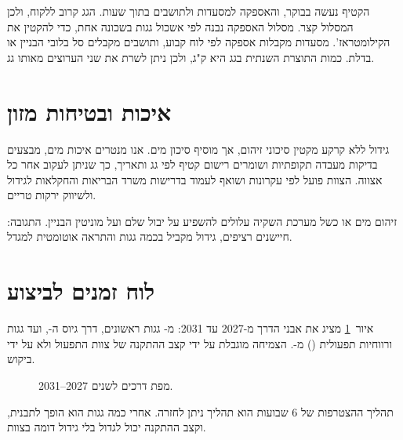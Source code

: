הקטיף נעשה בבוקר, והאספקה למסעדות ולתושבים בתוך שעות. הגג קרוב ללקוח, ולכן המסלול קצר. מסלול האספקה נבנה לפי אשכול גגות בשכונה אחת, כדי להקטין את הקילומטראז'. מסעדות מקבלות אספקה לפי לוח קבוע, ותושבים מקבלים סל בלובי הבניין או בדלת. כמות התוצרת השנתית בגג היא \RRroofKg{} ק"ג, ולכן ניתן לשרת את שני הערוצים מאותו גג.

\section{איכות ובטיחות מזון}\label{sec:quality}

גידול ללא קרקע מקטין סיכוני זיהום, אך מוסיף סיכון מים. אנו מנטרים איכות מים, מבצעים בדיקות מעבדה תקופתיות ושומרים רישום קטיף לפי גג ותאריך, כך שניתן לעקוב אחר כל אצווה. הצוות פועל לפי עקרונות  ושואף לעמוד בדרישות משרד הבריאות והחקלאות לגידול ולשיווק ירקות טריים.

\begin{riskbox}
זיהום מים או כשל מערכת השקיה עלולים להשפיע על יבול שלם ועל מוניטין הבניין. התגובה: חיישנים רציפים, גידול מקביל בכמה גגות והתראה אוטומטית למגדל.
\end{riskbox}

\section{לוח זמנים לביצוע}\label{sec:timeline}

איור~\ref{fig:timeline} מציג את אבני הדרך מ-2027 עד 2031: מ-\RRroofsFirst{} גגות ראשונים, דרך גיוס ה-, ועד \RRroofsFinal{} גגות ורווחיות תפעולית () מ-\RRbreakEvenYear. הצמיחה מוגבלת על ידי קצב ההתקנה של צוות התפעול ולא על ידי ביקוש.

\begin{figure}[htbp]
  \centering
  \resizebox{\linewidth}{!}{}
  \caption{מפת דרכים לשנים 2027--2031.}
  \label{fig:timeline}
\end{figure}

\begin{insightbox}[תובנה]
תהליך ההצטרפות של 6 שבועות הוא תהליך ניתן לחזרה. אחרי כמה גגות הוא הופך לתבנית, וקצב ההתקנה יכול לגדול בלי גידול דומה בצוות.
\end{insightbox}
